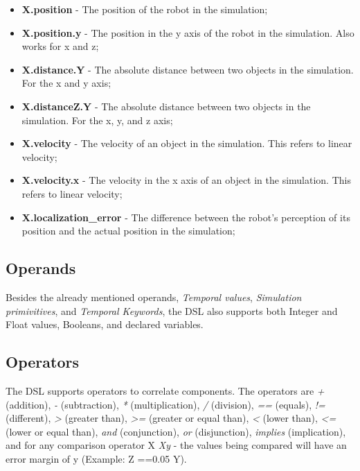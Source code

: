 \begin{itemize}
\item {\bfseries X.position} - The position of the robot in the simulation;
\item {\bfseries X.position.y} - The position in the y axis of the robot in the simulation. Also works for x and z;
\item {\bfseries X.distance.Y} - The absolute distance between two objects in the simulation. For the x and y axis;
\item {\bfseries X.distanceZ.Y} - The absolute distance between two objects in the simulation. For the x, y, and z axis;
\item {\bfseries X.velocity} - The velocity of an object in the simulation. This refers to linear velocity;
\item {\bfseries X.velocity.x} - The velocity in the x axis of an object in the simulation. This refers to linear velocity;
\item {\bfseries X.localization\_error} - The difference between the robot's perception of its position and the actual position in the simulation;
\end{itemize}


\subsection{Operands}
\label{ssec:operands}

Besides the already mentioned operands, \textit{Temporal values}, \textit{Simulation primivitives}, and \textit{Temporal Keywords}, the DSL also supports both Integer and Float values, Booleans, and declared variables.


\subsection{Operators}
\label{ssec:operators}

The DSL supports operators to correlate components. The operators are \textit{+} (addition), \textit{-} (subtraction), \textit{*} (multiplication), \textit{/} (division), \textit{==} (equals), \textit{!=} (different), \textit{>} (greater than), \textit{>=} (greater or equal than), \textit{<} (lower than), \textit{<=} (lower or equal than), \textit{and} (conjunction), \textit{or} (disjunction), \textit{implies} (implication), and for any comparison operator X \textit{X{y}} - the values being compared will have an error margin of y (Example: Z =={0.05} Y).


